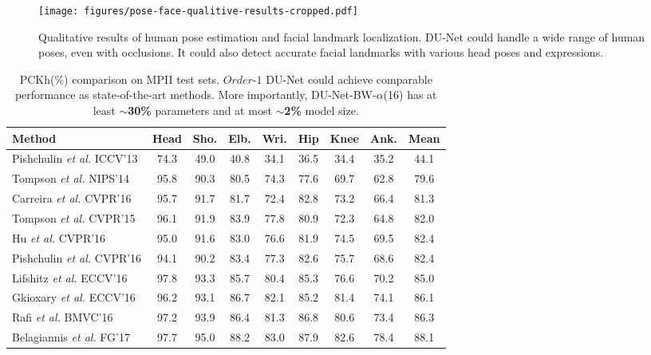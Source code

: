 \documentclass[runningheads]{llncs}
\begin{document}
\begin{figure*}[t!]
\centering
  \texttt{[image: figures/pose-face-qualitive-results-cropped.pdf]}
\caption{Qualitative results of human pose estimation and facial landmark localization. DU-Net could handle a wide range of human poses, even with occlusions. It could also detect accurate facial landmarks with various head poses and expressions.}
\label{fig:pose-face-qualitive}
\end{figure*}

\begin{table}[t!]
\begin{center}
\small
\setlength\tabcolsep{1.5pt}
\caption{PCKh(\%) comparison on MPII test sets. $Order$-$1$ DU-Net could achieve comparable performance as state-of-the-art methods. More importantly, DU-Net-BW-$\alpha$(16) has at least $\sim${\bf 30\%} parameters and at most $\sim${\bf 2\%} model size.}\label{tb:mpii}
\begin{tabular}{@{}lcccccccc@{}}
\toprule
Method & Head & Sho. & Elb. & Wri. & Hip & Knee & Ank. & Mean\\
\hline
Pishchulin \textit{et al.} ICCV'13 \cite{pishchulin2013strong} & 74.3 & 49.0 & 40.8 & 34.1 & 36.5 & 34.4 & 35.2 & 44.1\\
Tompson \textit{et al. } NIPS'14 \cite{tompson2014joint} & 95.8 & 90.3 & 80.5 & 74.3 & 77.6 & 69.7 & 62.8 & 79.6\\
Carreira \textit{et al.} CVPR'16 \cite{carreira2016human} & 95.7 & 91.7 & 81.7 & 72.4 & 82.8 & 73.2 & 66.4 & 81.3\\
Tompson \textit{et al.} CVPR'15 \cite{tompson2015efficient}& 96.1 & 91.9 & 83.9 & 77.8 & 80.9 & 72.3 & 64.8 & 82.0\\
Hu \textit{et al.} CVPR'16 \cite{hu2016bottom}& 95.0 & 91.6 & 83.0 & 76.6 & 81.9 & 74.5 & 69.5 & 82.4\\
Pishchulin \textit{et al.} CVPR'16 \cite{pishchulin2016deepcut}&94.1 & 90.2 & 83.4 & 77.3 & 82.6 & 75.7 & 68.6 & 82.4\\
Lifshitz \textit{et al.} ECCV'16 \cite{lifshitz2016human} & 97.8 & 93.3 & 85.7 & 80.4 & 85.3 & 76.6 & 70.2 & 85.0\\
Gkioxary \textit{et al.} ECCV'16 \cite{gkioxari2016chained} & 96.2 & 93.1 & 86.7 & 82.1 & 85.2 & 81.4 & 74.1 & 86.1\\
Rafi \textit{et al.} BMVC'16 \cite{rafi2016efficient} & 97.2 & 93.9 & 86.4 & 81.3 & 86.8 & 80.6 & 73.4 & 86.3\\
Belagiannis \textit{et al.} FG'17 \cite{belagiannis2017recurrent}&97.7 & 95.0 & 88.2 & 83.0 & 87.9 & 82.6 & 78.4 & 88.1\\

\end{tabular}
\end{center}
\end{table}
\end{document}
